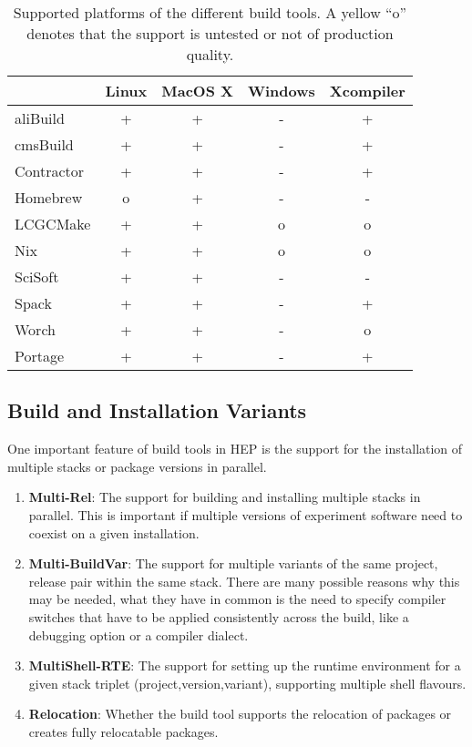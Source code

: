 \documentclass[12pt,a4paper]{article}
\begin{document}
\begin{table}
\centering
\begin{tabular}{lcccc}
& Linux & MacOS X & Windows & Xcompiler \\ \hline
aliBuild & \cellcolor{green} + & \cellcolor{green} + & \cellcolor{red} - & \cellcolor{green} +  \\
cmsBuild & \cellcolor{green} + & \cellcolor{green} + & \cellcolor{red} - & \cellcolor{green} +  \\
Contractor & \cellcolor{green} + & \cellcolor{green} + & \cellcolor{red} - & \cellcolor{green} + \\
Homebrew & \cellcolor{yellow} o & \cellcolor{green} + & \cellcolor{red} - & \cellcolor{red} -\\
LCGCMake & \cellcolor{green} + & \cellcolor{green} + & \cellcolor{yellow} o   & \cellcolor{yellow} o \\
Nix & \cellcolor{green} + & \cellcolor{green} + & \cellcolor{yellow} o  & \cellcolor{yellow} o \\
SciSoft &  \cellcolor{green} + & \cellcolor{green} + & \cellcolor{red} - & \cellcolor{red} - \\
Spack & \cellcolor{green} + & \cellcolor{green} + & \cellcolor{red} - & \cellcolor{green} +\\
Worch &  \cellcolor{green} + &  \cellcolor{green}  + & \cellcolor{red} -  &  \cellcolor{yellow} o \\
Portage &  \cellcolor{green} + &  \cellcolor{green}  + & \cellcolor{red} - &  \cellcolor{green} +
\end{tabular}
\caption{\label{tab:taxonomyPlatforms}Supported platforms of the different build tools. A yellow ``o'' denotes that the support is untested or not of production quality.}
\end{table}

\subsection{Build and Installation Variants}
One important feature of build tools in HEP is the support for the installation of multiple stacks or package versions in parallel.
\begin{enumerate}
\item \textbf{Multi-Rel}: The support for building and installing multiple stacks in parallel. This is important if multiple versions of experiment software need to coexist on a given installation.
\item \textbf{Multi-BuildVar}: The support for multiple variants of the same project, release pair within the same stack. There are many possible reasons why this may be needed, what they have in common is the need to specify compiler switches that have to be applied consistently across the build, like a debugging option or a compiler dialect.
\item \textbf{MultiShell-RTE}: The support for setting up the runtime environment for a given stack triplet (project,version,variant), supporting multiple shell flavours.
\item \textbf{Relocation}: Whether the build tool supports the relocation of packages or creates fully relocatable packages.
\end{enumerate}
\end{document}
